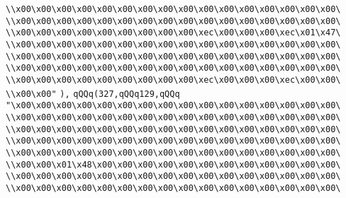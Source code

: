 \verb|\\x00\x00\x00\x00\x00\x00\x00\x00\x00\x00\x00\x00\x00\x00\x00\x00\|\newline
\verb|\\x00\x00\x00\x00\x00\x00\x00\x00\x00\x00\x00\x00\x00\x00\x00\x00\|\newline
\verb|\\x00\x00\x00\x00\x00\x00\x00\x00\x00\xec\x00\x00\x00\xec\x01\x47\|\newline
\verb|\\x00\x00\x00\x00\x00\x00\x00\x00\x00\x00\x00\x00\x00\x00\x00\x00\|\newline
\verb|\\x00\x00\x00\x00\x00\x00\x00\x00\x00\x00\x00\x00\x00\x00\x00\x00\|\newline
\verb|\\x00\x00\x00\x00\x00\x00\x00\x00\x00\x00\x00\x00\x00\x00\x00\x00\|\newline
\verb|\\x00\x00\x00\x00\x00\x00\x00\x00\x00\xec\x00\x00\x00\xec\x00\x00\|\newline
\verb|\\x00\x00"|\newline
\verb|),|\newline
\verb|qQQq(327,qQQq129,qQQq|\newline
\verb|"\x00\x00\x00\x00\x00\x00\x00\x00\x00\x00\x00\x00\x00\x00\x00\x00\|\newline
\verb|\\x00\x00\x00\x00\x00\x00\x00\x00\x00\x00\x00\x00\x00\x00\x00\x00\|\newline
\verb|\\x00\x00\x00\x00\x00\x00\x00\x00\x00\x00\x00\x00\x00\x00\x00\x00\|\newline
\verb|\\x00\x00\x00\x00\x00\x00\x00\x00\x00\x00\x00\x00\x00\x00\x00\x00\|\newline
\verb|\\x00\x00\x00\x00\x00\x00\x00\x00\x00\x00\x00\x00\x00\x00\x00\x00\|\newline
\verb|\\x00\x00\x01\x48\x00\x00\x00\x00\x00\x00\x00\x00\x00\x00\x00\x00\|\newline
\verb|\\x00\x00\x00\x00\x00\x00\x00\x00\x00\x00\x00\x00\x00\x00\x00\x00\|\newline
\verb|\\x00\x00\x00\x00\x00\x00\x00\x00\x00\x00\x00\x00\x00\x00\x00\x00\|\newline
